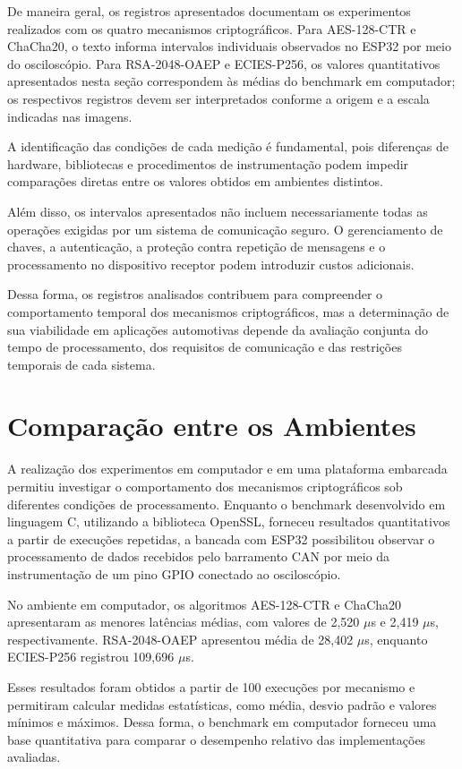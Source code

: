 De maneira geral, os registros apresentados documentam os experimentos realizados com os quatro mecanismos criptográficos. Para AES-128-CTR e ChaCha20, o texto informa intervalos individuais observados no ESP32 por meio do osciloscópio. Para RSA-2048-OAEP e ECIES-P256, os valores quantitativos apresentados nesta seção correspondem às médias do benchmark em computador; os respectivos registros devem ser interpretados conforme a origem e a escala indicadas nas imagens.

A identificação das condições de cada medição é fundamental, pois diferenças de hardware, bibliotecas e procedimentos de instrumentação podem impedir comparações diretas entre os valores obtidos em ambientes distintos.

Além disso, os intervalos apresentados não incluem necessariamente todas as operações exigidas por um sistema de comunicação seguro. O gerenciamento de chaves, a autenticação, a proteção contra repetição de mensagens e o processamento no dispositivo receptor podem introduzir custos adicionais.

Dessa forma, os registros analisados contribuem para compreender o comportamento temporal dos mecanismos criptográficos, mas a determinação de sua viabilidade em aplicações automotivas depende da avaliação conjunta do tempo de processamento, dos requisitos de comunicação e das restrições temporais de cada sistema.


\section{Comparação entre os Ambientes}

A realização dos experimentos em computador e em uma plataforma embarcada permitiu investigar o comportamento dos mecanismos criptográficos sob diferentes condições de processamento. Enquanto o benchmark desenvolvido em linguagem C, utilizando a biblioteca OpenSSL, forneceu resultados quantitativos a partir de execuções repetidas, a bancada com ESP32 possibilitou observar o processamento de dados recebidos pelo barramento CAN por meio da instrumentação de um pino GPIO conectado ao osciloscópio.

No ambiente em computador, os algoritmos AES-128-CTR e ChaCha20 apresentaram as menores latências médias, com valores de 2,520 $\mu$s e 2,419 $\mu$s, respectivamente. RSA-2048-OAEP apresentou média de 28,402 $\mu$s, enquanto ECIES-P256 registrou 109,696 $\mu$s.

Esses resultados foram obtidos a partir de 100 execuções por mecanismo e permitiram calcular medidas estatísticas, como média, desvio padrão e valores mínimos e máximos. Dessa forma, o benchmark em computador forneceu uma base quantitativa para comparar o desempenho relativo das implementações avaliadas.

